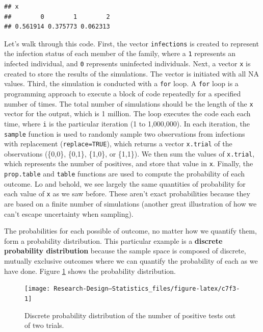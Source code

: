 \documentclass[
]{book}
\begin{document}
\begin{verbatim}
## x
##        0        1        2 
## 0.561914 0.375773 0.062313
\end{verbatim}

Let's walk through this code. First, the vector \texttt{infections} is created to represent the infection status of each member of the family, where a \texttt{1} represents an infected individual, and \texttt{0} represents uninfected individuals. Next, a vector \texttt{x} is created to store the results of the simulations. The vector is initiated with all NA values. Third, the simulation is conducted with a \texttt{for} loop. A \texttt{for} loop is a programming approach to execute a block of code repeatedly for a specified number of times. The total number of simulations should be the length of the \texttt{x} vector for the output, which is 1 million. The loop executes the code each each time, where \texttt{i} is the particular iteration (1 to 1,000,000). In each iteration, the \texttt{sample} function is used to randomly sample two observations from infections with replacement (\texttt{replace=TRUE}), which returns a vector \texttt{x.trial} of the observations (\{0,0\}, \{0,1\}, \{1,0\}, or \{1,1\}). We then sum the values of \texttt{x.trial}, which represents the number of positives, and store that value in \texttt{x}. Finally, the \texttt{prop.table} and \texttt{table} functions are used to compute the probability of each outcome. Lo and behold, we see largely the same quantities of probability for each value of \texttt{x} as we saw before. These aren't exact probabilities because they are based on a finite number of simulations (another great illustration of how we can't escape uncertainty when sampling).

The probabilities for each possible of outcome, no matter how we quantify them, form a probability distribution. This particular example is a \textbf{discrete probability distribution} because the sample space is composed of discrete, mutually exclusive outcomes where we can quantify the probability of each as we have done. Figure \ref{fig:c7f3} shows the probability distribution.

\begin{figure}

{\centering \texttt{[image: Research-Design---Statistics\_files/figure-latex/c7f3-1]} 

}

\caption{Discrete probability distribution of the number of positive tests out of two trials.}\label{fig:c7f3}
\end{figure}
\end{document}
